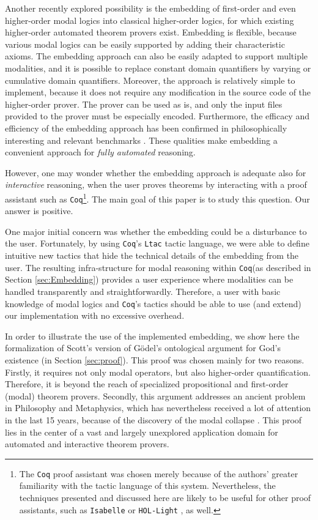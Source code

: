 \documentclass{llncs}
\newcommand{\Coq}{\texttt{Coq}\xspace}
\begin{document}
Another recently explored possibility \cite{J23,B9,J22} is the
embedding of first-order and even higher-order modal logics into classical
higher-order logics, for which existing higher-order automated theorem
provers \cite{ToDo:Leo,Satallax} exist.  Embedding is flexible,
because various modal logics can be easily supported by adding their
characteristic axioms.  The embedding approach can also be easily
adapted to support multiple modalities, and it is possible to replace
constant domain quantifiers by varying or cumulative domain
quantifiers.  Moreover, the approach is relatively simple to
implement, because it does not require any modification in the source
code of the higher-order prover. The prover can be used as is, and
only the input files provided to the prover must be especially
encoded. Furthermore, the efficacy and efficiency of the embedding
approach has been confirmed in philosophically interesting and
relevant benchmarks \cite{FormalTheologyRepository}. These qualities
make embedding a convenient approach for \emph{fully automated}
reasoning.

However, one may wonder whether the embedding approach is adequate
also for \emph{interactive} reasoning, when the user proves theorems
by interacting with a proof assistant such as \Coq\footnote{The \Coq
proof assistant was chosen merely because of the authors' greater
familiarity with the tactic language of this system. Nevertheless, the
techniques presented and discussed here are likely to be useful for
other proof assistants, such as \texttt{Isabelle} \cite{Isabelle} or
\texttt{HOL-Light} \cite{HOLLight}, as well.}. The main goal of this
paper is to study this question. Our answer is positive.

One major initial concern was whether the embedding could be a
disturbance to the user. Fortunately, by using \Coq's \texttt{Ltac}
tactic language, we were able to define intuitive new tactics that
hide the technical details of the embedding from the user. The
resulting infra-structure for modal reasoning within \Coq (as
described in Section \ref{sec:Embedding}) provides a user experience where
modalities can be handled transparently and straightforwardly.
Therefore, a user with basic knowledge of modal logics and \Coq's
tactics should be able to use (and extend) our implementation with no
excessive overhead.

In order to illustrate the use of the implemented embedding, we show
here the formalization of Scott's version \cite{Scott} of Gödel's
ontological argument for God's existence (in Section \ref{sec:proof}).
This proof was chosen mainly for two reasons. Firstly, it requires not
only modal operators, but also higher-order quantification. Therefore,
it is beyond the reach of specialized propositional and first-order
(modal) theorem provers. Secondly, this argument addresses an ancient
problem in Philosophy and Metaphysics, which has nevertheless received
a lot of attention in the last 15 years, because of the discovery of
the modal collapse \cite{ToDo}. This proof lies in the center of a
vast and largely unexplored application domain for automated and
interactive theorem provers.
\end{document}
